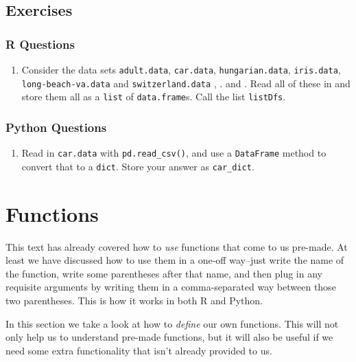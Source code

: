 \documentclass[
  12pt,
]{krantz}
\providecommand{\tightlist}{%
  \setlength{\itemsep}{0pt}\setlength{\parskip}{0pt}}
\begin{document}
\hypertarget{exercises-3}{%
\section{Exercises}\label{exercises-3}}

\hypertarget{r-questions-3}{%
\subsection{R Questions}\label{r-questions-3}}

\begin{enumerate}
\def\labelenumi{\arabic{enumi}.}
\tightlist
\item
  Consider the data sets \texttt{adult.data}, \texttt{car.data}, \texttt{hungarian.data}, \texttt{iris.data}, \texttt{long-beach-va.data} and \texttt{switzerland.data} \citep{misc_heart_disease_45}, \citep{misc_iris_53}. \citep{misc_adult_2} and \citep{misc_car_evaluation_19}. Read all of these in and store them all as a \texttt{list} of \texttt{data.frame}s. Call the list \texttt{listDfs}.
\end{enumerate}

\hypertarget{python-questions-3}{%
\subsection{Python Questions}\label{python-questions-3}}

\begin{enumerate}
\def\labelenumi{\arabic{enumi}.}
\tightlist
\item
  Read in \texttt{car.data} with \texttt{pd.read\_csv()}, and use a \texttt{DataFrame} method to convert that to a \texttt{dict}. Store your answer as \texttt{car\_dict}.
\end{enumerate}

\hypertarget{functions}{%
\chapter{Functions}\label{functions}}

This text has already covered how to \emph{use} functions that come to us pre-made. At least we have discussed how to use them in a one-off way--just write the name of the function, write some parentheses after that name, and then plug in any requisite arguments by writing them in a comma-separated way between those two parentheses. This is how it works in both R and Python.

In this section we take a look at how to \emph{define} our own functions. This will not only help us to understand pre-made functions, but it will also be useful if we need some extra functionality that isn't already provided to us.
\end{document}
